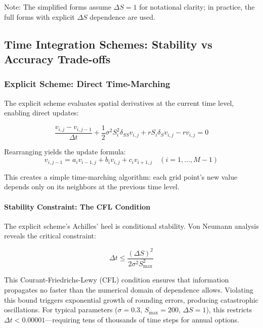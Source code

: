 \documentclass[11pt,a4paper]{article}
\begin{document}
Note: The simplified forms assume $\Delta S = 1$ for notational clarity; in practice, the full forms with explicit $\Delta S$ dependence are used.

\subsection{Time Integration Schemes: Stability vs Accuracy Trade-offs}

\subsubsection{Explicit Scheme: Direct Time-Marching}

The explicit scheme evaluates spatial derivatives at the current time level, enabling direct updates:

\begin{equation}
\frac{v_{i,j} - v_{i,j-1}}{\Delta t} + \frac{1}{2}\sigma^2 S_i^2 \delta_{SS}v_{i,j} + rS_i\delta_S v_{i,j} - rv_{i,j} = 0
\end{equation}

Rearranging yields the update formula:
\begin{equation}
v_{i,j-1} = a_i v_{i-1,j} + b_i v_{i,j} + c_i v_{i+1,j} \quad (i = 1,\ldots,M-1)
\end{equation}

This creates a simple time-marching algorithm: each grid point's new value depends only on its neighbors at the previous time level.

\paragraph{Stability Constraint: The CFL Condition}

The explicit scheme's Achilles' heel is conditional stability. Von Neumann analysis reveals the critical constraint:

\begin{equation}
\Delta t \leq \frac{(\Delta S)^2}{2\sigma^2 S_{\max}^2}
\end{equation}

This Courant-Friedrichs-Lewy (CFL) condition ensures that information propagates no faster than the numerical domain of dependence allows. Violating this bound triggers exponential growth of rounding errors, producing catastrophic oscillations. For typical parameters ($\sigma = 0.3$, $S_{\max} = 200$, $\Delta S = 1$), this restricts $\Delta t < 0.00001$—requiring tens of thousands of time steps for annual options.
\end{document}
